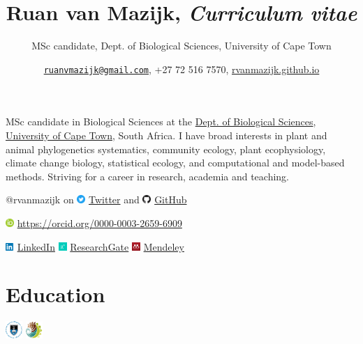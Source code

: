 \documentclass[]{article}
\title{Ruan van Mazijk, \emph{Curriculum vitae}}
\subtitle{MSc candidate, Dept. of Biological Sciences, University of Cape Town}
\author{\href{mailto:ruanvmazijk@gmail.com}{\nolinkurl{ruanvmazijk@gmail.com}},
+27 72 516 7570,
\href{https://rvanmazijk.github.io}{rvanmazijk.github.io}}
\date{}
\begin{document}
\maketitle

MSc candidate in Biological Sciences at the
\href{http://www.biologicalsciences.uct.ac.za/}{Dept. of Biological
Sciences}, \href{http://www.uct.ac.za/}{University of Cape Town}, South
Africa. I have broad interests in plant and animal phylogenetics
systematics, community ecology, plant ecophysiology, climate change
biology, statistical ecology, and computational and model-based methods.
Striving for a career in research, academia and teaching.

@rvanmazijk on
\includegraphics[width=0.125in,height=\textheight]{logos/Twitter.png}
\href{https://twitter.com/rvanmazijk}{Twitter} and
\includegraphics[width=0.125in,height=\textheight]{logos/GitHub.png}
\href{https://github.com/rvanmazijk}{GitHub}

\includegraphics[width=0.125in,height=\textheight]{logos/ORCID.png}
\url{https://orcid.org/0000-0003-2659-6909}

\includegraphics[width=0.125in,height=\textheight]{logos/LinkedIn.png}
\href{https://www.linkedin.com/in/ruan-van-mazijk-4a04b0127}{LinkedIn}
\includegraphics[width=0.125in,height=\textheight]{logos/ResearchGate-green.jpg}
\href{https://www.researchgate.net/profile/Ruan_Van_Mazijk}{ResearchGate}
\includegraphics[width=0.125in,height=\textheight]{logos/Mendeley-red.png}
\href{https://www.mendeley.com/profiles/ruan-van-mazijk}{Mendeley}

\hypertarget{education}{%
\section{Education}\label{education}}

\includegraphics[width=0.25in,height=\textheight]{logos/UCT.png}
\includegraphics[width=0.25in,height=\textheight]{logos/BIO.png}
\end{document}
